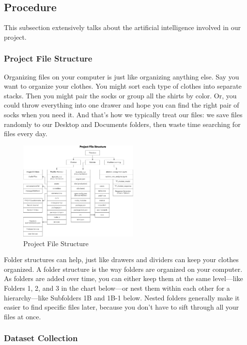 \documentclass[conference,compsoc]{IEEEtran}
\begin{document}
\subsection{Procedure}

This subsection extensively talks about the artificial intelligence involved in our project.

\subsubsection{Project File Structure}

Organizing files on your computer is just like organizing anything else. Say you want to organize your clothes. You might sort each type of clothes into separate stacks. Then you might pair the socks or group all the shirts by color. Or, you could throw everything into one drawer and hope you can find the right pair of socks when you need it. And that's how we typically treat our files: we save files randomly to our Desktop and Documents folders, then waste time searching for files every day.

\begin{figure}[H]
    \centering
    \includegraphics[width=6cm]{images/project-file-structure.png}
    \caption{Project File Structure}
\end{figure}

Folder structures can help, just like drawers and dividers can keep your clothes organized. A folder structure is the way folders are organized on your computer. As folders are added over time, you can either keep them at the same level—like Folders 1, 2, and 3 in the chart below—or nest them within each other for a hierarchy—like Subfolders 1B and 1B-1 below. Nested folders generally make it easier to find specific files later, because you don’t have to sift through all your files at once.

\subsubsection{Dataset Collection}
\end{document}
